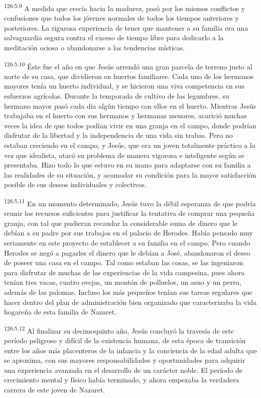 \par
\textsuperscript{126:5.9} A medida que crecía hacia la madurez, pasó por los mismos conflictos y confusiones que todos los jóvenes normales de todos los tiempos anteriores y posteriores. La rigurosa experiencia de tener que mantener a su familia era una salvaguardia segura contra el exceso de tiempo libre para dedicarlo a la meditación ociosa o abandonarse a las tendencias místicas.

\par
\textsuperscript{126:5.10} Éste fue el año en que Jesús arrendó una gran parcela de terreno justo al norte de su casa, que dividieron en huertos familiares. Cada uno de los hermanos mayores tenía un huerto individual, y se hicieron una viva competencia en sus esfuerzos agrícolas. Durante la temporada de cultivo de las legumbres, su hermano mayor pasó cada día algún tiempo con ellos en el huerto. Mientras Jesús trabajaba en el huerto con sus hermanos y hermanas menores, acarició muchas veces la idea de que todos podían vivir en una granja en el campo, donde podrían disfrutar de la libertad y la independencia de una vida sin trabas. Pero no estaban creciendo en el campo, y Jesús, que era un joven totalmente práctico a la vez que idealista, atacó su problema de manera vigorosa e inteligente según se presentaba. Hizo todo lo que estuvo en su mano para adaptarse con su familia a las realidades de su situación, y acomodar su condición para la mayor satisfacción posible de sus deseos individuales y colectivos.

\par
\textsuperscript{126:5.11} En un momento determinado, Jesús tuvo la débil esperanza de que podría reunir los recursos suficientes para justificar la tentativa de comprar una pequeña granja, con tal que pudieran recaudar la considerable suma de dinero que le debían a su padre por sus trabajos en el palacio de Herodes. Había pensado muy seriamente en este proyecto de establecer a su familia en el campo. Pero cuando Herodes se negó a pagarles el dinero que le debían a José, abandonaron el deseo de poseer una casa en el campo. Tal como estaban las cosas, se las ingeniaron para disfrutar de muchas de las experiencias de la vida campesina, pues ahora tenían tres vacas, cuatro ovejas, un montón de polluelos, un asno y un perro, además de las palomas. Incluso los más pequeños tenían sus tareas regulares que hacer dentro del plan de administración bien organizado que caracterizaba la vida hogareña de esta familia de Nazaret.

\par
\textsuperscript{126:5.12} Al finalizar su decimoquinto año, Jesús concluyó la travesía de este período peligroso y difícil de la existencia humana, de esta época de transición entre los años más placenteros de la infancia y la conciencia de la edad adulta que se aproxima, con sus mayores responsabilidades y oportunidades para adquirir una experiencia avanzada en el desarrollo de un carácter noble. El período de crecimiento mental y físico había terminado, y ahora empezaba la verdadera carrera de este joven de Nazaret.